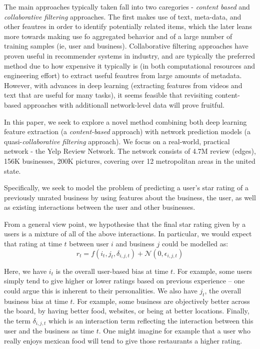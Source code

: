\documentclass[letterpaper, 11 pt, conference]{ieeeconf}  %
\begin{document}
The main approaches typically taken fall into two caregories - \textit{content based} and \textit{collaborative filtering} approaches. The first makes use of text, meta-data, and other feautres in order to identify potentially related items, which the later leans more towards making use fo aggregated behavior and of a large number of training samples (ie, user and business). Collaborative filtering approaches have proven useful in recommender systems in industry, and are typically the preferred method due to how expensive it typically is (in both computational resources and engineering effort) to extract useful feautres from large amounts of metadata. However, with advances in deep learning (extracting features from videos and text that are useful for many tasks), it seems feasible that revisiting content-based approaches with additionall network-level data will prove fruitful.

In this paper, we seek to explore a novel method combining both deep learning feature extraction (a \textit{content-based} approach) with network prediction models (a quasi-\textit{collaborative filtering} approach). We focus on a real-world, practical network - the Yelp Review Network. The network consists of 4.7M review (edges), 156K businesses, 200K pictures, covering over 12 metropolitan areas in the united state.

Specifically, we seek to model the problem of predicting a user's star rating of a previously unrated business by using features about the business, the user, as well as existing interactions between the user and other businesses.

From a general view point, we hypothesise that the final star rating given by a users is a mixture of all of the above interactions. In particular, we would expect that rating at time $t$ between user $i$ and business $j$ could be modelled as:
$$
r_t = f(i_t, j_t, \delta_{i,j,t}) + \mathcal{N}(0,\epsilon_{i,j,t})
$$

Here, we have $i_t$ is the overall user-based bias at time $t$. For example, some users simply tend to give higher or lower ratings based on previous experience -- one could argue this is inherent to their personalities. We also have $j_t$, the overall business bias at time $t$. For example, some business are objectively better across the board, by having better food, websites, or being at better locations. Finally, the term $\delta_{i,j,t}$ which is an interaction term reflecting the interaction between this user and the business as time $t$. One might imagine for example that a user who really enjoys mexican food will tend to give those restaurants a higher rating.
\end{document}
